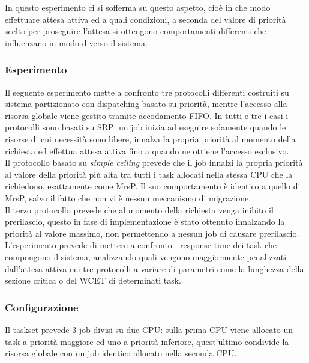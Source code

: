 \noindent In questo esperimento ci si sofferma su questo aspetto, cioè in che modo effettuare attesa attiva ed a quali condizioni, a seconda del valore di priorità scelto per proseguire l'attesa si ottengono comportamenti differenti che influenzano in modo diverso il sistema.\\

\subsubsection{Esperimento}
\label{sec:confronto_protocolli_exp}

\noindent Il seguente esperimento mette a confronto tre protocolli differenti costruiti su sistema partizionato con dispatching basato su priorità, mentre l'accesso alla risorsa globale viene gestito tramite accodamento FIFO. In tutti e tre i casi i protocolli sono basati su SRP: un job inizia ad eseguire solamente quando le risorse di cui necessità sono libere, innalza la propria priorità al momento della richiesta ed effettua attesa attiva fino a quando ne ottiene l'accesso esclusivo.\\

\noindent Il protocollo basato su \textit{simple ceiling} prevede che il job innalzi la propria priorità al valore della priorità più alta tra tutti i task allocati nella stessa CPU che la richiedono, esattamente come MrsP. Il suo comportamento è identico a quello di MrsP, salvo il fatto che non vi è nessun meccanismo di migrazione.\\

\noindent Il terzo protocollo prevede che al momento della richiesta venga inibito il prerilascio, questo in fase di implementazione è stato ottenuto innalzando la priorità al valore massimo, non permettendo a nessun job di causare prerilascio.\\

\noindent L'esperimento prevede di mettere a confronto i response time dei task che compongono il sistema, analizzando quali vengono maggiormente penalizzati dall'attesa attiva nei tre protocolli a variare di parametri come la lunghezza della sezione critica o del WCET di determinati task.\\

\subsubsection{Configurazione}
\label{sec:confronto_protocolli_conf}

\noindent Il taskset prevede 3 job divisi su due CPU: sulla prima CPU viene allocato un task a priorità maggiore ed uno a priorità inferiore, quest'ultimo condivide la risorsa globale con un job identico allocato nella seconda CPU.\\

